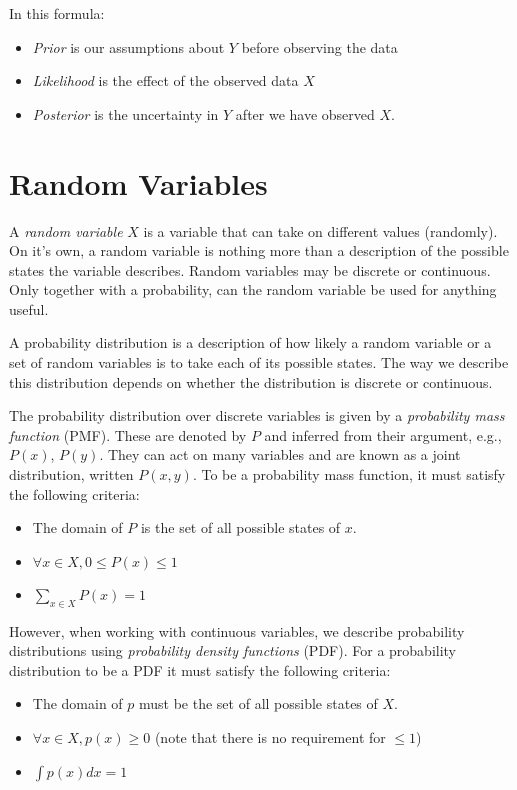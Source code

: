 In this formula:
\begin{itemize}
	\item \textit{Prior} is our assumptions about $Y$ before observing the data
	\item \textit{Likelihood} is the effect of the observed data $X$
	\item \textit{Posterior} is the uncertainty in $Y$ after we have observed $X$.
\end{itemize}


\section{Random Variables}%
\label{sec:label}

A \textit{random variable} $X$ is a variable that can take on different values (randomly). On it's own, a random variable is nothing more than a description of the possible states the variable describes. Random variables may be discrete or continuous. Only together with a probability, can the random variable be used for anything useful.

A probability distribution is a description of how likely a random variable or a set of random variables is to take each of its possible states. The way we describe this distribution depends on whether the distribution is discrete or continuous.

The probability distribution over discrete variables is given by a \textit{probability mass function} (PMF). These are denoted by $P$ and inferred from their argument, e.g., $P(x)$, $P(y)$. They can act on many variables and are known as a joint distribution, written $P(x,y)$. To be a probability mass function, it must satisfy the following criteria:
\begin{itemize}
	\item The domain of $P$ is the set of all possible states of $x$.
	\item $\forall x \in X, 0 \le P(x) \le 1$
	\item $\sum_{x \in X} P(x) = 1$
\end{itemize}

However, when working with continuous variables, we describe probability distributions using \textit{probability density functions} (PDF). For a probability distribution to be a PDF it must satisfy the following criteria:
\begin{itemize}
	\item The domain of $p$ must be the set of all possible states of $X$.
	\item $\forall x \in X, p(x) \ge 0$ (note that there is no requirement for $\le 1$)
	\item $\int p(x)dx = 1$
\end{itemize}


